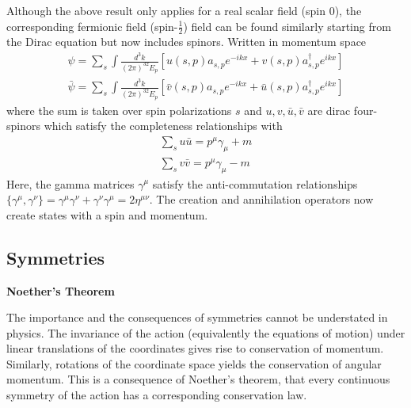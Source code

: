 Although the above result only applies for a real scalar field (spin 0), the corresponding fermionic field (spin-$\frac{1}{2}$) field can be found similarly starting from the Dirac equation but now includes spinors. Written
in momentum space
\begin{align*}
\psi = \sum_s \int \frac{d^3k}{(2\pi)^32E_p} \left [ u(s,p)  a_{s,p} e^{-ikx} + v(s,p)a_{s,p}^\dagger e^{ikx} \right ]\\
\bar \psi = \sum_s \int \frac{d^3k}{(2\pi)^32E_p} \left[ \bar{v}(s,p) a_{s,p}  e^{-ikx} + \bar{u}(s,p)a_{s,p}^\dagger e^{ikx}\right]
\end{align*}
where the sum is taken over spin polarizations $s$ and $u,v,\bar{u},\bar{v}$ are dirac 
four-spinors which satisfy the completeness relationships with 
\begin{align*}
\sum_s u \bar{u} = p^\mu \gamma_\mu + m \\
\sum_s v \bar{v} = p^\mu \gamma_\mu - m
\end{align*}
Here, the gamma matrices $\gamma^\mu$ satisfy the anti-commutation relationships
$\{ \gamma^\mu, \gamma^\nu \} =  \gamma^\mu \gamma^\nu + \gamma^\nu \gamma^\mu = 2\eta^{\mu\nu}$.
The creation and annihilation operators now create states with a spin and momentum.

\subsection{Symmetries}
\textbf{Noether's Theorem}

The importance and the consequences of symmetries cannot be understated in physics. The
invariance of the action (equivalently the equations of motion) under linear translations of the  coordinates
gives rise to conservation of momentum. Similarly,  rotations of the coordinate space
yields the conservation of angular momentum. This is a consequence of Noether's theorem, that every 
continuous symmetry of the action has a corresponding conservation law. 

